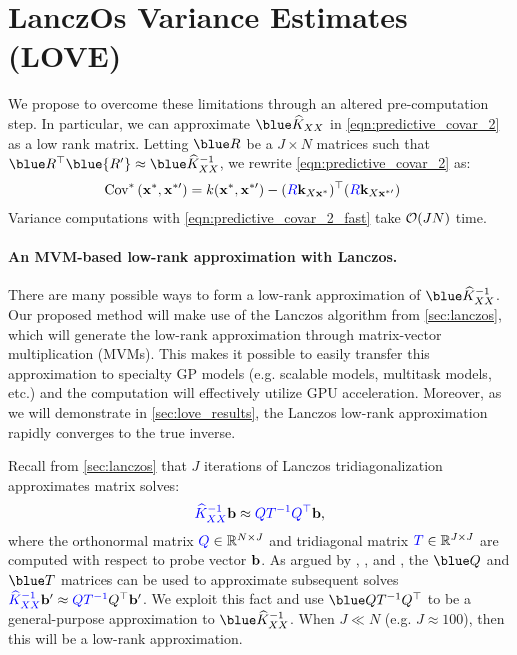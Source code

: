 \section{LanczOs Variance Estimates (LOVE)}
\label{sec:love_method}



We propose to overcome these limitations through an altered pre-computation step.
In particular, we can approximate $\blue \trainK$ in \cref{eqn:predictive_covar_2} as a low rank matrix.
Letting $\blue \bR$ be a $J \times N$ matrices such that $\blue \bR^\top \blue{\bR'} \approx \blue \trainK^{-1}$, we rewrite \cref{eqn:predictive_covar_2} as:
%
\begin{align}
  \text{Cov}^* \left( \mathbf{x}^*, \mathbf{x}^{*\prime} \right)
  &= k(\mathbf{x}^*, \mathbf{x}^{*\prime}) - ({\color{blue} R} \mathbf{k}_{X\mathbf{x}^*})^\top ({\color{blue} R} \mathbf{k}_{X\mathbf{x}^{*\prime}})
  \label{eqn:predictive_covar_2_fast}
\end{align}
%
Variance computations with \cref{eqn:predictive_covar_2_fast} take $\bigo{JN}$ time.

\paragraph{An MVM-based low-rank approximation with Lanczos.}
There are many possible ways to form a low-rank approximation of $\blue \trainK^{-1}$.
Our proposed method will make use of the Lanczos algorithm from \cref{sec:lanczos}, which will generate the low-rank approximation through matrix-vector multiplication (MVMs).
This makes it possible to easily transfer this approximation to specialty GP models (e.g. scalable models, multitask models, etc.) and the computation will effectively utilize GPU acceleration.
Moreover, as we will demonstrate in \cref{sec:love_results}, the Lanczos low-rank approximation rapidly converges to the true inverse.

Recall from \cref{sec:lanczos} that $J$ iterations of Lanczos tridiagonalization approximates matrix solves:
\[
  {\color{blue} \widehat{K}_{XX}^{-1}} \mathbf{b} \approx {\color{blue} \ensuremath{Q}\ensuremath{T}^{-1} \ensuremath{Q}^{\top}} \mathbf{b},
\]
where the orthonormal matrix ${\color{blue} Q} \in \mathbb{R}^{N \times J}$ and tridiagonal matrix ${\color{blue} T} \in \mathbb{R}^{J \times J}$ are computed with respect to probe vector $\mathbf{b}$.
As argued by \citet{parlett1980new}, \citet{saad1987lanczos}, and \citet{schneider2001krylov}, the $\blue \bQ$ and $\blue \bT$ matrices can be used to approximate subsequent solves
${\color{blue} \widehat{K}_{XX}^{-1}} \mathbf{b}' \approx {\color{blue} \ensuremath{Q}\ensuremath{T}^{-1}} Q^\top \mathbf{b}'$.
We exploit this fact and use $\blue \bQ \bT^{-1} \bQ^\top$ to be a general-purpose approximation to $\blue \trainK^{-1}$.
When $J \ll N$ (e.g. $J \approx 100$), then this will be a low-rank approximation.

